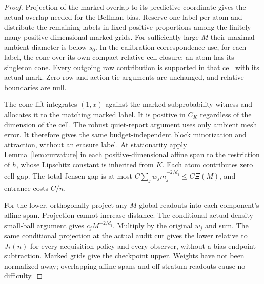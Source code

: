 \begin{proof}
Projection of the marked overlap to its predictive coordinate gives the actual overlap needed for the Bellman bias. Reserve one label per atom and distribute the remaining labels in fixed positive proportions among the finitely many positive-dimensional marked grids. For sufficiently large $M$ their maximal ambient diameter is below $s_0$. In the calibration correspondence use, for each label, the cone over its own compact relative cell closure; an atom has its singleton cone. Every outgoing raw contribution is supported in that cell with its actual mark. Zero-row and action-tie arguments are unchanged, and relative boundaries are null.

The cone lift integrates $(1,x)$ against the marked subprobability witness and allocates it to the matching marked label. It is positive in $C_K$ regardless of the dimension of the cell. The robust quiet-report argument uses only ambient mesh error. It therefore gives the same budget-independent block minorization and attraction, without an erasure label. At stationarity apply Lemma~\ref{lem:curvature} in each positive-dimensional affine span to the restriction of $h$, whose Lipschitz constant is inherited from $K$. Each atom contributes zero cell gap. The total Jensen gap is at most
$C\sum_jw_jm_j^{-2/d_j}\le C\Xi(M)$, and entrance costs $C/n$.

For the lower, orthogonally project any $M$ global readouts into each component's affine span. Projection cannot increase distance. The conditional actual-density small-ball argument gives $c_jM^{-2/d_j}$. Multiply by the original $w_j$ and sum. The same conditional projection at the actual audit cut gives the lower relative to $J_*(n)$ for every acquisition policy and every observer, without a bias endpoint subtraction. Marked grids give the checkpoint upper. Weights have not been normalized away; overlapping affine spans and off-stratum readouts cause no difficulty.
\end{proof}

